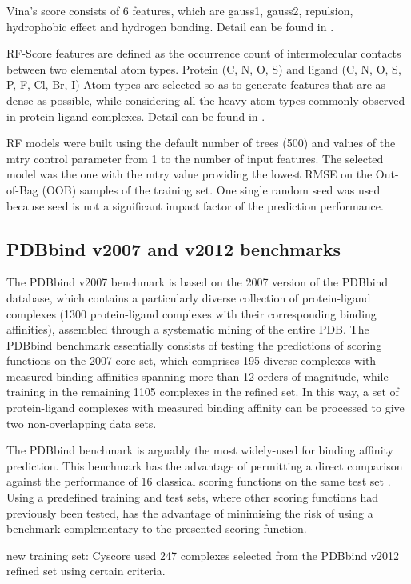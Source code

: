 \documentclass[journal=jacsat,manuscript=article]{achemso}
\begin{document}
Vina's score consists of 6 features, which are gauss1, gauss2, repulsion, hydrophobic effect and hydrogen bonding. Detail can be found in \cite{595,1362}.

RF-Score features are defined as the occurrence count of intermolecular contacts between two elemental atom types. Protein (C, N, O, S) and ligand (C, N, O, S, P, F, Cl, Br, I) Atom types are selected so as to generate features that are as dense as possible, while considering all the heavy atom types commonly observed in protein-ligand complexes. Detail can be found in \cite{564,1362}.

RF models were built using the default number of trees (500) and values of the mtry control parameter from 1 to the number of input features. The selected model was the one with the mtry value providing the lowest RMSE on the Out-of-Bag (OOB) samples of the training set. One single random seed was used because seed is not a significant impact factor of the prediction performance.

\subsection{PDBbind v2007 and v2012 benchmarks}

The PDBbind v2007 benchmark is based on the 2007 version of the PDBbind database, which contains a particularly diverse collection of protein-ligand complexes (1300 protein-ligand complexes with their corresponding binding affinities), assembled through a systematic mining of the entire PDB. The PDBbind benchmark essentially consists of testing the predictions of scoring functions on the 2007 core set, which comprises 195 diverse complexes with measured binding affinities spanning more than 12 orders of magnitude, while training in the remaining 1105 complexes in the refined set. In this way, a set of protein-ligand complexes with measured binding affinity can be processed to give two non-overlapping data sets.

The PDBbind benchmark is arguably the most widely-used for binding affinity prediction. This benchmark has the advantage of permitting a direct comparison against the performance of 16 classical scoring functions on the same test set \cite{1313}. Using a predefined training and test sets, where other scoring functions had previously been tested, has the advantage of minimising the risk of using a benchmark complementary to the presented scoring function.

new training set: Cyscore used 247 complexes selected from the PDBbind v2012 refined set using certain criteria.
\end{document}
